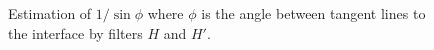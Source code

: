 \documentclass[reprint,amsmath,amssymb,aps,pre,showkeys,showpacs]{revtex4-1}
\begin{document}
\begin{figure}[!pt]
  \centering
  \hfill
  \caption[]{Estimation of $1/\sin\phi$ where $\phi$ is the angle between
    tangent lines to the interface by filters $H$ and $H'$.}
  \label{fig:angles}
\end{figure}
\end{document}
